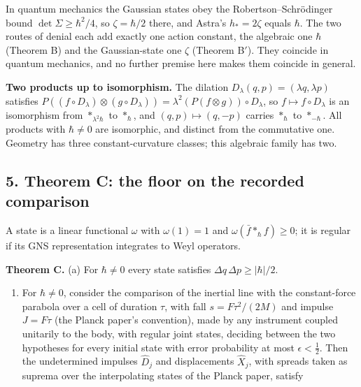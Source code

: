 \documentclass[11pt,a4paper]{article}
\newcommand{\tightlist}{\setlength{\itemsep}{0pt}\setlength{\parskip}{0pt}}
\begin{document}
In quantum mechanics the Gaussian states obey the Robertson--Schrödinger
bound \(\det\Sigma\ge\hbar^2/4\), so \(\zeta=\hbar/2\) there, and
Astra's \(h_*=2\zeta\) equals \(\hbar\). The two routes of denial each
add exactly one action constant, the algebraic one \(\hbar\) (Theorem B)
and the Gaussian-state one \(\zeta\) (Theorem B\('\)). They coincide in
quantum mechanics, and no further premise here makes them coincide in
general.

\textbf{Two products up to isomorphism.} The dilation
\(D_\lambda(q,p)=(\lambda q,\lambda p)\) satisfies
\(P((f\circ D_\lambda)\otimes(g\circ D_\lambda))=\lambda^2(P(f\otimes g))\circ D_\lambda\),
so \(f\mapsto f\circ D_\lambda\) is an isomorphism from
\(*_{\lambda^2\hbar}\) to \(*_\hbar\), and \((q,p)\mapsto(q,-p)\)
carries \(*_\hbar\) to \(*_{-\hbar}\). All products with \(\hbar\ne0\)
are isomorphic, and distinct from the commutative one. Geometry has
three constant-curvature classes; this algebraic family has two.

\hypertarget{theorem-c-the-floor-on-the-recorded-comparison}{%
\subsection{5. Theorem C: the floor on the recorded
comparison}\label{theorem-c-the-floor-on-the-recorded-comparison}}

A state is a linear functional \(\omega\) with \(\omega(1)=1\) and
\(\omega(\bar f*_\hbar f)\ge0\); it is regular if its GNS representation
integrates to Weyl operators.

\textbf{Theorem C.} (a) For \(\hbar\ne0\) every state satisfies
\(\Delta q\,\Delta p\ge|\hbar|/2\).

\begin{enumerate}
\def\labelenumi{(\alph{enumi})}
\setcounter{enumi}{1}
\tightlist
\item
  For \(\hbar\ne0\), consider the comparison of the inertial line with
  the constant-force parabola over a cell of duration \(\tau\), with
  fall \(s=F\tau^2/(2M)\) and impulse \(J=F\tau\) (the Planck paper's
  convention), made by any instrument coupled unitarily to the body,
  with regular joint states, deciding between the two hypotheses for
  every initial state with error probability at most
  \(\epsilon<\frac12\). Then the undetermined impulses \(\hat D_j\) and
  displacements \(\hat X_j\), with spreads taken as suprema over the
  interpolating states of the Planck paper, satisfy
\end{enumerate}
\end{document}
